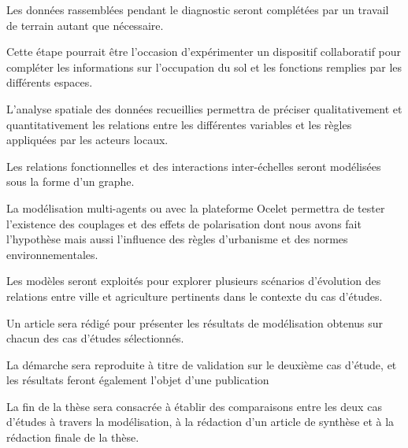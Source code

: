 
\subject{2ème année}


\item   Les données rassemblées pendant le diagnostic
	seront complétées par un travail de terrain
	autant que nécessaire.

	Cette étape pourrait être l'occasion d'expérimenter un dispositif collaboratif
	pour compléter les informations sur l'occupation du sol
	et les fonctions remplies par les différents espaces.

\item	L'analyse spatiale des données recueillies
	permettra de préciser qualitativement et quantitativement
	les relations entre les différentes variables et les règles appliquées
	par les acteurs locaux.
	
	Les relations fonctionnelles
	et des interactions inter-échelles seront modélisées
	sous la forme d'un graphe.

\item La modélisation multi-agents ou avec la plateforme Ocelet
	permettra de tester l'existence des couplages et des effets de polarisation
	dont nous avons fait l'hypothèse
	mais aussi l'influence des règles d'urbanisme et des normes environnementales.

	Les modèles seront exploités pour explorer
	plusieurs scénarios d'évolution des relations entre ville et
	agriculture pertinents dans le contexte du cas d'études.

\item Un article sera rédigé pour présenter
	les résultats de modélisation obtenus sur chacun des cas d'études sélectionnés.


\subject{3ème année}


\item La démarche sera reproduite à titre de validation
	sur le deuxième cas d'étude,
	et les résultats feront également l'objet d'une publication

\item La fin de la thèse sera consacrée à établir des comparaisons
	entre les deux cas d'études à travers la modélisation,
	à la rédaction d'un article de synthèse
	et à la rédaction finale de la thèse.

\stopitemize